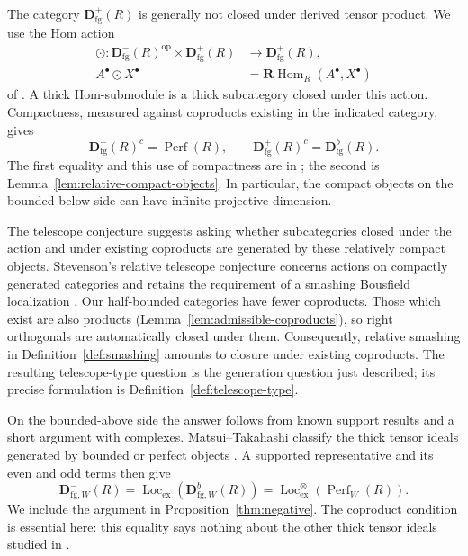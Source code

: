 \documentclass[11pt]{amsart}
\numberwithin{equation}{section}
\theoremstyle{definition}
\theoremstyle{remark}
\DeclareMathOperator{\Perf}{Perf}
\DeclareMathOperator{\Loc}{Loc}
\DeclareMathOperator{\Hom}{Hom}
\newcommand{\RHom}{\mathbf R\!\Hom}
\newcommand{\D}{\mathbf D}
\newcommand{\fg}{\mathrm{fg}}
\newcommand{\Lex}{\Loc_{\mathrm{ex}}}
\newcommand{\Lten}{\Loc_{\mathrm{ex}}^{\otimes}}
\begin{document}
The category $\D^+_{\fg}(R)$ is generally not closed under derived
tensor product. We use the Hom action
\begin{equation}\label{eq:action-intro}
 \begin{aligned}
 \odot:\D^-_{\fg}(R)^{\mathrm{op}}\times\D^+_{\fg}(R)
 &\longrightarrow\D^+_{\fg}(R),\\
 A^{\bullet}\odot X^{\bullet}&=\RHom_R(A^{\bullet},X^{\bullet})
 \end{aligned}
\end{equation}
of \cite[Lemma~6.4 and Appendix~B.4]{Zhu26a}. A thick
Hom-submodule is a thick subcategory closed under this action.
Compactness, measured against coproducts existing in the indicated
category, gives
\begin{equation}\label{eq:cores-intro}
 \D^-_{\fg}(R)^c=\Perf(R),\qquad
 \D^+_{\fg}(R)^c=\D^b_{\fg}(R).
\end{equation}
The first equality and this use of compactness are in
\cite[Proposition~2.1]{MT17}; the second is
Lemma~\ref{lem:relative-compact-objects}. In particular, the compact
objects on the bounded-below side can have infinite projective
dimension.

The telescope conjecture suggests asking whether subcategories
closed under the action and under existing coproducts are generated
by these relatively compact objects. Stevenson's relative telescope
conjecture concerns actions on compactly generated categories and
retains the requirement of a smashing Bousfield localization
\cite[Definition~7.1]{Stevenson13}. Our half-bounded categories have
fewer coproducts. Those which exist are also products
(Lemma~\ref{lem:admissible-coproducts}), so right orthogonals are
automatically closed under them. Consequently, relative smashing
in Definition~\ref{def:smashing} amounts to closure under existing
coproducts. The resulting telescope-type question is the generation
question just described; its precise formulation is
Definition~\ref{def:telescope-type}.

On the bounded-above side the answer follows from known support
results and a short argument with complexes. Matsui--Takahashi
classify the thick tensor ideals generated by bounded or perfect
objects \cite[Theorem~2.12 and Corollary~2.14]{MT17}. A supported
representative and its even and odd terms then give
\[
 \D^-_{\fg,W}(R)=\Lex(\D^b_{\fg,W}(R))=\Lten(\Perf_W(R)).
\]
We include the argument in Proposition~\ref{thm:negative}.
The coproduct condition is essential here: this equality says
nothing about the other thick tensor ideals studied in
\cite{MT17,SZ26}.
\end{document}
